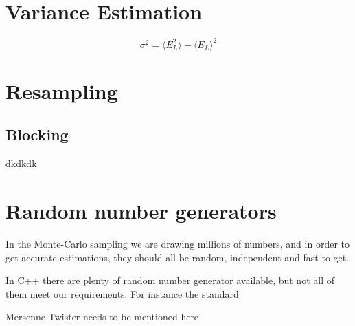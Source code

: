 \section{Variance Estimation}
\begin{equation}
\sigma^2=\langle E_L^2\rangle - \langle E_L\rangle^2
\end{equation}

\section{Resampling}
\subsection{Blocking}
dkdkdk



\section{Random number generators} \label{sec:RNG}
In the Monte-Carlo sampling we are drawing millions of numbers, and in order to get accurate estimations, they should all be random, independent and fast to get. 

In C++ there are plenty of random number generator available, but not all of them meet our requirements. For instance the standard 

Mersenne Twister needs to be mentioned here